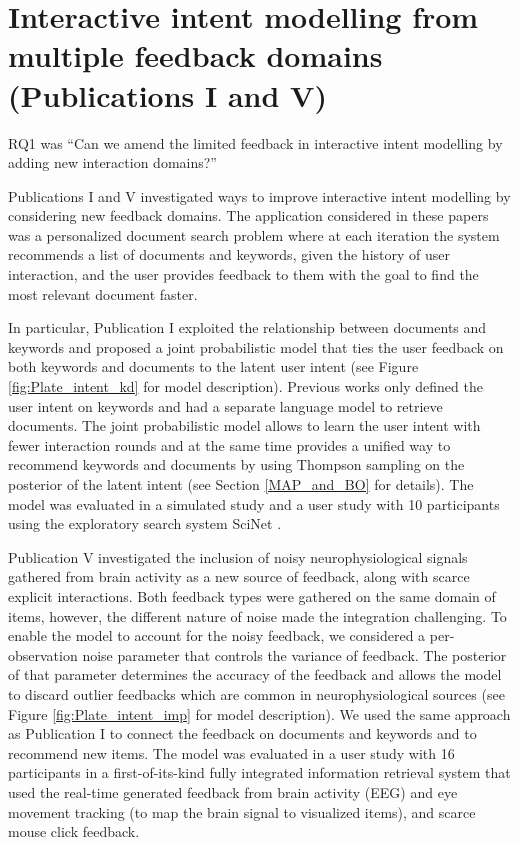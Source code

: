 \documentclass[dissertation,math,vertlayout,pdfa,colorlinks]{aaltoseries}
\begin{document}
\section{Interactive intent modelling from multiple feedback domains (Publications I and V)}


RQ1 was ``Can we amend the limited feedback in interactive intent modelling by adding new interaction domains?''

Publications I and V investigated ways to improve interactive intent modelling by considering new feedback domains. The application considered in these papers was a personalized document search problem where at each iteration the system recommends a list of documents and keywords, given the history of user interaction, and the user provides feedback to them with the goal to find the most relevant document faster.

In particular, Publication I exploited the relationship between documents and keywords and proposed a joint probabilistic model that ties the user feedback on both keywords and documents to the latent user intent (see Figure \ref{fig:Plate_intent_kd} for model description). Previous works \cite{GlowIUI2013,ruotsalo2015interactive} only defined the user intent on keywords and had a separate language model to retrieve documents. The joint probabilistic model allows to learn the user intent with fewer interaction rounds and at the same time provides a unified way to recommend keywords and documents by using Thompson sampling on the posterior of the latent intent (see Section \ref{MAP_and_BO} for details). The model was evaluated in a simulated study and a user study with 10 participants using the exploratory search system SciNet \cite{GlowIUI2013}. 

Publication V investigated the inclusion of noisy neurophysiological signals gathered from brain activity as a new source of feedback, along with scarce explicit interactions. Both feedback types were gathered on the same domain of items, however, the different nature of noise made the integration challenging.  
To enable the model to account for the noisy feedback, we considered a per-observation noise parameter that controls the variance of feedback. 
The posterior of that parameter determines the accuracy of the feedback and allows the model to discard outlier feedbacks which are common in neurophysiological sources (see Figure \ref{fig:Plate_intent_imp} for model description). We used the same approach as Publication I to connect the feedback on documents and keywords and to recommend new items. The model was evaluated in a user study with 16 participants in a first-of-its-kind fully integrated information retrieval system that used the real-time generated feedback from brain activity (EEG) and eye movement tracking (to map the brain signal to visualized items), and scarce mouse click feedback.
\end{document}
